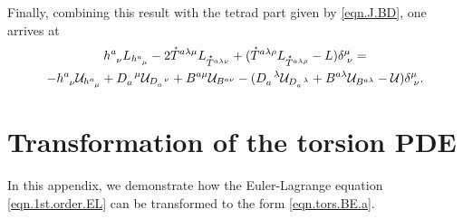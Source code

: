 \documentclass[
10pt, %
a4paper, %
oneside, %
headinclude,footinclude, %
BCOR5mm, %
]{scrartcl}
\newcommand{\tetrsymbol}{h}
\newcommand{\tetr}[2]{\tetrsymbol^{#1}_{\phantom{#1}#2}}
\newcommand{\dT}[2]{D_{#1}^{\phantom{#1}\,#2}}	%
\newcommand{\bT}[2]{B^{#1#2}}	%
\newcommand{\Laghodge}{L}%
\newcommand{\LagST}{\mathcal{U}}%
\newcommand{\HDT}[1]{\accentset{\star}{T}^{#1}}
\newcommand{\KD}[2]{\delta^{#1}_{\,\,#2}}
\begin{document}
Finally, combining this result with the tetrad part given by \eqref{eqn.J.BD}, one arrives at
\begin{multline}
	\tetr{a}{\nu} \Laghodge_{\tetr{a}{\mu}}
		- 2 \HDT{a\lambda\mu}L_{\HDT{a\lambda\nu}} + 
	(\HDT{a\lambda\rho}L_{\HDT{a\lambda\rho}} - L) \KD{\mu}{\nu} = \\
	- \tetr{a}{\nu} \LagST_{\tetr{a}{\mu}}
	+ \dT{a}{\mu}\LagST_{\dT{a}{\nu}} + \bT{a}{\mu}\LagST_{\bT{a}{\nu}}
	- (
	\dT{a}{\lambda}\LagST_{\dT{a}{\lambda}}+ \bT{a}{\lambda}\LagST_{\bT{a}{\lambda}}
	-\LagST
	) \KD{\mu}{\nu}.	
\end{multline}






\section{Transformation of the torsion PDE}\label{app.sec.Deqn}

In this appendix, we demonstrate how the Euler-Lagrange equation \eqref{eqn.1st.order.EL} can be 
transformed to the form \eqref{eqn.tors.BE.a}.
\end{document}
